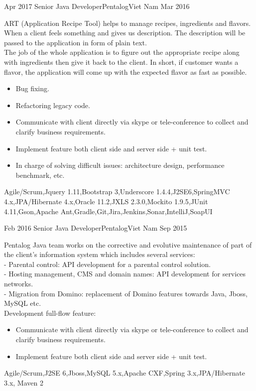 %
%
%
\begin{experiences}
\experience
  {Apr 2017}  {Senior Java Developer}{Pentalog}{Viet Nam}
  {Mar 2016}  {  
ART (Application Recipe Tool) helps to manage recipes, ingredients and flavors. When a client feels something and gives us description. The description will be passed to the application in form of plain text.\\
The job of the whole application is to figure out the appropriate recipe along with ingredients then give it back to the client. In short, if customer wants a flavor, the application will come up with the expected flavor as fast as possible.
	\begin{itemize}
        \item Bug fixing.       
        \item Refactoring legacy code.                          
        \item Communicate with client directly via skype or tele-conference to collect and clarify business requirements.
        \item Implement feature both client side and server side + unit test.       
        \item In charge of solving difficult issues: architecture design, performance benchmark, etc.                          
	\end{itemize}
}
{Agile/Scrum,Jquery 1.11,Bootstrap 3,Underscore 1.4.4,J2SE6,SpringMVC 4.x,JPA/Hibernate 4.x,Oracle 11.2,JXLS 2.3.0,Mockito 1.9.5,JUnit 4.11,Gson,Apache Ant,Gradle,Git,Jira,Jenkins,Sonar,IntelliJ,SoapUI}
\emptySeparator

\experience
  {Feb 2016}  {Senior Java Developer}{Pentalog}{Viet Nam}
  {Sep 2015}  {  
Pentalog Java team works on the corrective and evolutive maintenance of part of the client’s information system which includes several services:\\
- Parental control: API development for a parental control solution.\\
- Hosting management, CMS and domain names: API development for services networks.\\
- Migration from Domino: replacement of Domino features towards Java, Jboss, MySQL etc.\\
[0.2 cm]
Development full-flow  feature:
	\begin{itemize}
        \item Communicate with client directly via skype or tele-conference to collect and clarify business requirements.       
        \item Implement feature both client side and server side + unit test.                          
	\end{itemize}
}
{Agile/Scrum,J2SE 6,Jboss,MySQL 5.x,Apache CXF,Spring 3.x,JPA/Hibernate 3.x, Maven 2}
\emptySeparator


\end{experiences}
